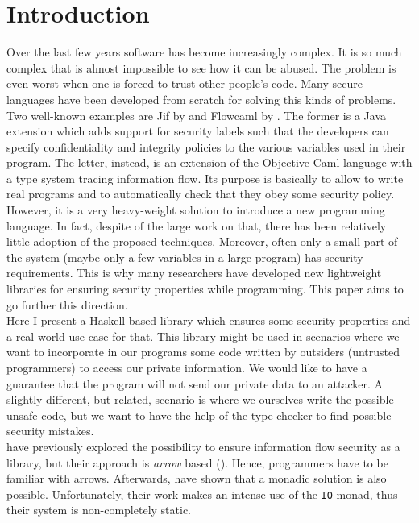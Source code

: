 \section{Introduction}
Over the last few years software has become increasingly complex. It is so much complex that is almost impossible to see how it can be abused. The problem is even worst when one is forced to trust other people's code. Many secure languages have been developed from scratch for solving this kinds of problems. Two well-known examples are Jif \cite{pullicino2014jif} by \citeauthor{pullicino2014jif} and Flowcaml \cite{simonet2003flow} by \citeauthor{simonet2003flow}. The former is a Java extension which adds support for security labels such that the developers can specify confidentiality and integrity policies to the various variables used in their program. The letter, instead, is an extension of the Objective Caml language with a type system tracing information flow. Its purpose is basically to allow to write real programs and to automatically check that they obey some security policy. \\
However, it is a very heavy-weight solution to introduce a new programming language. In fact, despite of the large work on that, there has been relatively little adoption of the proposed techniques. Moreover, often only a small part of the system (maybe only a few variables in a large program) has security requirements. This is why many researchers have developed new lightweight libraries for ensuring security properties while programming. This paper aims to go further this direction. \\
Here I present a Haskell based library which ensures some security properties and a real-world use case for that. This library might be used in scenarios where we want to incorporate in our programs some code written by outsiders (untrusted programmers) to access our private information. We would like to have a guarantee that the program will not send our private data to an attacker. A slightly different, but related, scenario is where we ourselves write the possible unsafe code, but we want to have the help of the type checker to find possible security mistakes. \\
\citeauthor{li2006encoding} \cite{li2006encoding} have previously explored the possibility to ensure information flow security as a library, but their approach is \textit{arrow} based (\cite{hughes2000generalising}). Hence, programmers have to be familiar with arrows. Afterwards, \citeauthor{russo2008library} \cite{russo2008library} have shown that a monadic solution is also possible. Unfortunately, their work makes an intense use of the \texttt{IO} monad, thus their system is non-completely static. \\
